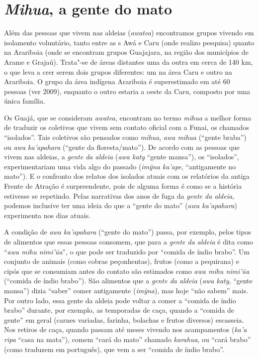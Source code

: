 \section{\emph{Mihua}, a gente do mato}

Além das pessoas que vivem nas aldeias (\emph{awatea}) encontramos
grupos vivendo em isolamento voluntário, tanto entre as s Awá e Caru
(onde realizo pesquisa) quanto na  Arariboia (onde se encontram grupos
Guajajara, na região dos municípios de Arame e Grajaú). Trata"-se de
áreas distantes uma da outra em cerca de 140 km, o que leva a crer serem
dois grupos diferentes: um na área Caru e outro na Arariboia. O grupo da
área indígena Arariboia é superestimado em até 60 pessoas (ver 
2009), enquanto o outro estaria a oeste da Caru, composto por uma única
família.

Os Guajá, que se consideram \emph{awatea}, encontram no termo
\emph{mihua} a melhor forma de traduzir os coletivos que vivem sem
contato oficial com a Funai, os chamados ``isolados''. Tais coletivos
são pensados como \emph{mihua}, \emph{awa mihua} (``gente braba'') ou
\emph{awa ka'apahara} (``gente da floresta/mato''). De acordo com as
pessoas que vivem nas aldeias, a \emph{gente da aldeia} (\emph{awa katy}
``gente mansa''), os ``isolados'', experimentariam uma vida algo do
passado (\emph{imỹna ka'ape}, ``antigamente no mato''). E o confronto dos
relatos dos isolados atuais com os relatórios da antiga Frente de
Atração é surpreendente, pois de alguma forma é como se a história
estivesse se repetindo. Pelas narrativas dos anos de fuga da \emph{gente
da aldeia}, podemos inclusive ter uma ideia do que a ``gente do mato''
(\emph{awa ka'apahara}) experimenta nos dias atuais.

A condição de \emph{awa ka'apahara} (``gente do mato'') passa, por
exemplo, pelos tipos de alimentos que essas pessoas consomem, que para a
\emph{gente da aldeia} é dita como ``\emph{awa mihu nimi'ũa}'', o que pode
ser traduzido por ``comida de índio brabo''. Um conjunto de animais (como
cobras peçonhentas), frutos (como a pequirana) e cipós que se consumiam
antes do contato são estimados como \emph{awa mihu nimi'ũa} (``comida de
índio brabo''). São alimentos que a \emph{gente da aldeia} (\emph{awa
katy}, ``gente mansa'') dizia ``saber'' comer antigamente (\emph{imỹna}),
mas hoje ``não sabem'' mais. Por outro lado, essa gente da aldeia pode
voltar a comer a ``comida de índio brabo'' durante, por exemplo, as
temporadas de caça, quando a ``comida de gente'' em geral (carnes
variadas, farinha, bolachas e frutos diversos) escasseia. Nos retiros de
caça, quando passam até meses vivendo nos acampamentos (\emph{ka'a ripa}
``casa na mata''), comem ``cará do mato'' chamado \emph{karahua}, ou ``cará
brabo'' (como traduzem em português), que vem a ser ``comida de índio
brabo''.

